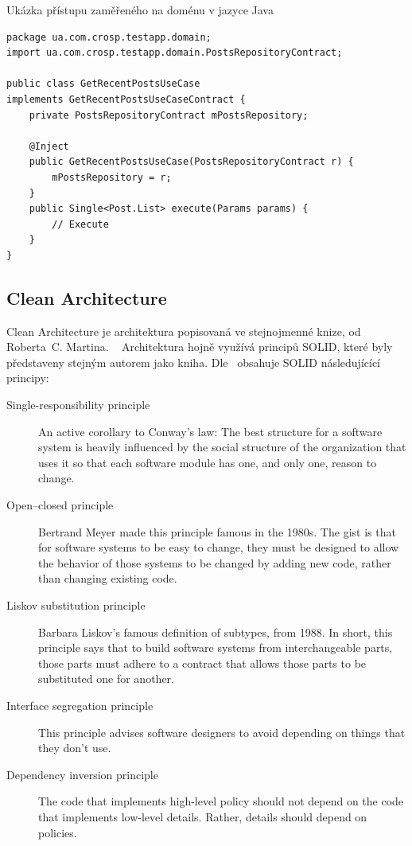 \begin{listing}
    \caption{Ukázka přístupu zaměřeného na doménu v jazyce Java~\cite{architecture}}
    \label{code:architecture-domain}
    \begin{verbatim}
package ua.com.crosp.testapp.domain;
import ua.com.crosp.testapp.domain.PostsRepositoryContract;

public class GetRecentPostsUseCase
implements GetRecentPostsUseCaseContract {
    private PostsRepositoryContract mPostsRepository;

    @Inject
    public GetRecentPostsUseCase(PostsRepositoryContract r) {
        mPostsRepository = r;
    }
    public Single<Post.List> execute(Params params) {
        // Execute
    }
}
    \end{verbatim}
\end{listing}

\subsection{Clean Architecture}

Clean Architecture je architektura popisovaná ve stejnojmenné knize,
od Roberta~C. Martina.
\emph{}~\cite[část 3]{martin_clean_architecture}
Architektura hojně využívá principů SOLID,
které byly představeny stejným autorem jako kniha.
Dle~\cite[část 3]{martin_clean_architecture} obsahuje SOLID následujícící
principy:

\begin{description}
    \item[Single-responsibility principle] An active corollary to Conway’s law:
    The best structure for a software system is heavily influenced
    by the social structure of the organization that uses it so that
    each software module has one, and only one, reason to change.
    \item[Open--closed principle] Bertrand Meyer made this principle famous
    in the 1980s.
    The gist is that for software systems to be easy to change,
    they must be designed to allow the behavior of those systems to be changed
    by adding new code,
    rather than changing existing code.
    \item[Liskov substitution principle] Barbara Liskov’s famous definition of
    subtypes, from 1988.
    In short, this principle says that to build software systems from
    interchangeable parts,
    those parts must adhere to a contract that allows those parts to be
    substituted one for another.
    \item[Interface segregation principle] This principle advises software
    designers to avoid depending on things that they don’t use.
    \item[Dependency inversion principle] The code that implements high-level
    policy should not depend on the code that implements low-level details.
    Rather, details should depend on policies.
\end{description}

